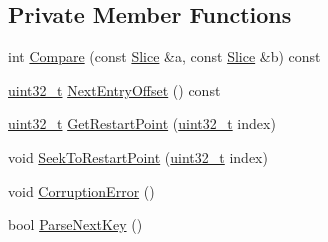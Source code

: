 \subsection*{Private Member Functions}
\begin{DoxyCompactItemize}
\item 
int \hyperlink{classleveldb_1_1_block_1_1_iter_a62e08ca268db6be5bca9a1648f6f854e}{Compare} (const \hyperlink{classleveldb_1_1_slice}{Slice} \&a, const \hyperlink{classleveldb_1_1_slice}{Slice} \&b) const 
\item 
\hyperlink{stdint_8h_a435d1572bf3f880d55459d9805097f62}{uint32\-\_\-t} \hyperlink{classleveldb_1_1_block_1_1_iter_a31bd42263cb99405a0d8fe7cc317fe16}{Next\-Entry\-Offset} () const 
\item 
\hyperlink{stdint_8h_a435d1572bf3f880d55459d9805097f62}{uint32\-\_\-t} \hyperlink{classleveldb_1_1_block_1_1_iter_a80e1396336c859c53790cad6c3cdd543}{Get\-Restart\-Point} (\hyperlink{stdint_8h_a435d1572bf3f880d55459d9805097f62}{uint32\-\_\-t} index)
\item 
void \hyperlink{classleveldb_1_1_block_1_1_iter_a356a5cae58d7f0f816fa366acf0722f5}{Seek\-To\-Restart\-Point} (\hyperlink{stdint_8h_a435d1572bf3f880d55459d9805097f62}{uint32\-\_\-t} index)
\item 
void \hyperlink{classleveldb_1_1_block_1_1_iter_ad8eff43010a2d3e0f30945ede9286521}{Corruption\-Error} ()
\item 
bool \hyperlink{classleveldb_1_1_block_1_1_iter_abb8c89f7256e79148d942ddbc4351775}{Parse\-Next\-Key} ()
\end{DoxyCompactItemize}
